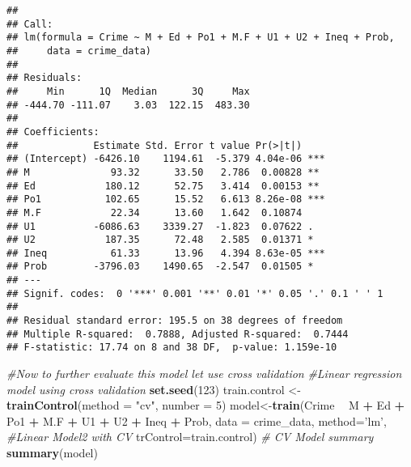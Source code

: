 \documentclass[
]{article}
\newenvironment{Shaded}{\begin{snugshade}}{\end{snugshade}}
\newcommand{\CommentTok}[1]{\textcolor[rgb]{0.56,0.35,0.01}{\textit{#1}}}
\newcommand{\DataTypeTok}[1]{\textcolor[rgb]{0.13,0.29,0.53}{#1}}
\newcommand{\DecValTok}[1]{\textcolor[rgb]{0.00,0.00,0.81}{#1}}
\newcommand{\KeywordTok}[1]{\textcolor[rgb]{0.13,0.29,0.53}{\textbf{#1}}}
\newcommand{\NormalTok}[1]{#1}
\newcommand{\OperatorTok}[1]{\textcolor[rgb]{0.81,0.36,0.00}{\textbf{#1}}}
\newcommand{\StringTok}[1]{\textcolor[rgb]{0.31,0.60,0.02}{#1}}
\begin{document}
\begin{verbatim}
## 
## Call:
## lm(formula = Crime ~ M + Ed + Po1 + M.F + U1 + U2 + Ineq + Prob, 
##     data = crime_data)
## 
## Residuals:
##     Min      1Q  Median      3Q     Max 
## -444.70 -111.07    3.03  122.15  483.30 
## 
## Coefficients:
##             Estimate Std. Error t value Pr(>|t|)    
## (Intercept) -6426.10    1194.61  -5.379 4.04e-06 ***
## M              93.32      33.50   2.786  0.00828 ** 
## Ed            180.12      52.75   3.414  0.00153 ** 
## Po1           102.65      15.52   6.613 8.26e-08 ***
## M.F            22.34      13.60   1.642  0.10874    
## U1          -6086.63    3339.27  -1.823  0.07622 .  
## U2            187.35      72.48   2.585  0.01371 *  
## Ineq           61.33      13.96   4.394 8.63e-05 ***
## Prob        -3796.03    1490.65  -2.547  0.01505 *  
## ---
## Signif. codes:  0 '***' 0.001 '**' 0.01 '*' 0.05 '.' 0.1 ' ' 1
## 
## Residual standard error: 195.5 on 38 degrees of freedom
## Multiple R-squared:  0.7888, Adjusted R-squared:  0.7444 
## F-statistic: 17.74 on 8 and 38 DF,  p-value: 1.159e-10
\end{verbatim}

\begin{Shaded}
\begin{Highlighting}[]
\CommentTok{#Now to further evaluate this model let use cross validation }
\CommentTok{#Linear regression model using cross validation }
\KeywordTok{set.seed}\NormalTok{(}\DecValTok{123}\NormalTok{)}
\NormalTok{train.control <-}\StringTok{ }\KeywordTok{trainControl}\NormalTok{(}\DataTypeTok{method =} \StringTok{"cv"}\NormalTok{, }\DataTypeTok{number =} \DecValTok{5}\NormalTok{)}
\NormalTok{model<-}\KeywordTok{train}\NormalTok{(Crime }\OperatorTok{~}\StringTok{ }\NormalTok{M }\OperatorTok{+}\StringTok{ }\NormalTok{Ed }\OperatorTok{+}\StringTok{ }\NormalTok{Po1 }\OperatorTok{+}\StringTok{ }\NormalTok{M.F }\OperatorTok{+}\StringTok{ }\NormalTok{U1 }\OperatorTok{+}\StringTok{ }\NormalTok{U2 }\OperatorTok{+}\StringTok{ }\NormalTok{Ineq }\OperatorTok{+}\StringTok{ }\NormalTok{Prob,}
               \DataTypeTok{data =}\NormalTok{ crime_data, }\DataTypeTok{method=}\StringTok{'lm'}\NormalTok{,  }\CommentTok{#Linear Model2 with CV}
               \DataTypeTok{trControl=}\NormalTok{train.control)          }
\CommentTok{# CV Model summary}
\KeywordTok{summary}\NormalTok{(model) }
\end{Highlighting}
\end{Shaded}
\end{document}
